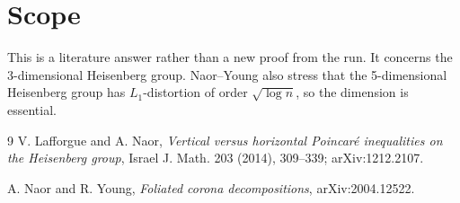 \documentclass[11pt]{article}
\begin{document}
\section*{Scope}

This is a literature answer rather than a new proof from the run. It concerns
the 3-dimensional Heisenberg group. Naor--Young also stress that the
5-dimensional Heisenberg group has \(L_1\)-distortion of order
\(\sqrt{\log n}\), so the dimension is essential.

\begin{thebibliography}{9}
V. Lafforgue and A. Naor,
\emph{Vertical versus horizontal Poincaré inequalities on the Heisenberg
group},
Israel J. Math. 203 (2014), 309--339; arXiv:1212.2107.

A. Naor and R. Young,
\emph{Foliated corona decompositions},
arXiv:2004.12522.
\end{thebibliography}
\end{document}

